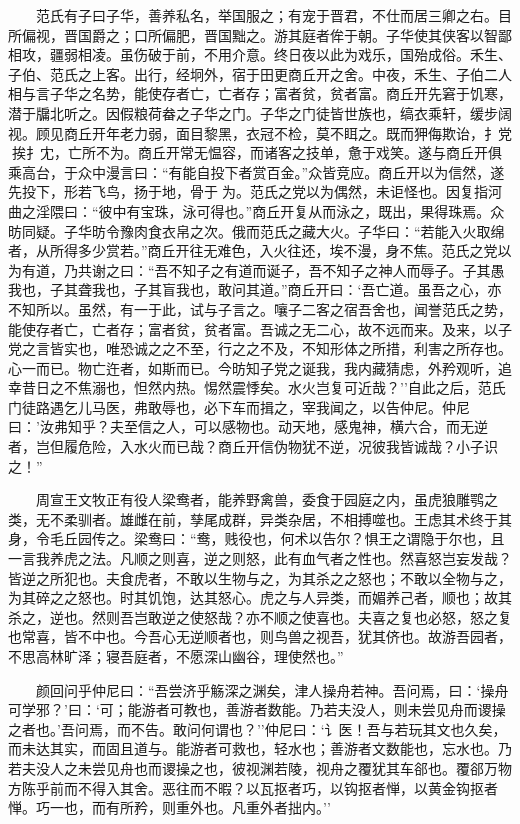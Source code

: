　　范氏有子曰子华，善养私名，举国服之；有宠于晋君，不仕而居三卿之右。目所偏视，晋国爵之；口所偏肥，晋国黜之。游其庭者侔于朝。子华使其侠客以智鄙相攻，疆弱相凌。虽伤破于前，不用介意。终日夜以此为戏乐，国殆成俗。禾生、子伯、范氏之上客。出行，经坰外，宿于田更商丘开之舍。中夜，禾生、子伯二人相与言子华之名势，能使存者亡，亡者存；富者贫，贫者富。商丘开先窘于饥寒，潜于牖北听之。因假粮荷畚之子华之门。子华之门徒皆世族也，缟衣乘轩，缓步阔视。顾见商丘开年老力弱，面目黎黑，衣冠不检，莫不眲之。既而狎侮欺诒，扌党挨扌冘，亡所不为。商丘开常无愠容，而诸客之技单，惫于戏笑。遂与商丘开俱乘高台，于众中漫言曰：``有能自投下者赏百金。''众皆竞应。商丘开以为信然，遂先投下，形若飞鸟，扬于地，骨于为。范氏之党以为偶然，未讵怪也。因复指河曲之淫隈曰：``彼中有宝珠，泳可得也。''商丘开复从而泳之，既出，果得珠焉。众昉同疑。子华昉令豫肉食衣帛之次。俄而范氏之藏大火。子华曰：``若能入火取绵者，从所得多少赏若。''商丘开往无难色，入火往还，埃不漫，身不焦。范氏之党以为有道，乃共谢之曰：``吾不知子之有道而诞子，吾不知子之神人而辱子。子其愚我也，子其聋我也，子其盲我也，敢问其道。''商丘开曰：`吾亡道。虽吾之心，亦不知所以。虽然，有一于此，试与子言之。嚷子二客之宿吾舍也，闻誉范氏之势，能使存者亡，亡者存；富者贫，贫者富。吾诚之无二心，故不远而来。及来，以子党之言皆实也，唯恐诚之之不至，行之之不及，不知形体之所措，利害之所存也。心一而已。物亡迕者，如斯而已。今昉知子党之诞我，我内藏猜虑，外矜观听，追幸昔日之不焦溺也，怛然内热。惕然震悸矣。水火岂复可近哉？''自此之后，范氏门徒路遇乞儿马医，弗敢辱也，必下车而揖之，宰我闻之，以告仲尼。仲尼曰：'汝弗知乎？夫至信之人，可以感物也。动天地，感鬼神，横六合，而无逆者，岂但履危险，入水火而已哉？商丘开信伪物犹不逆，况彼我皆诚哉？小子识之！''

　　周宣王文牧正有役人梁鸯者，能养野禽兽，委食于园庭之内，虽虎狼雕鹗之类，无不柔驯者。雄雌在前，孳尾成群，异类杂居，不相搏噬也。王虑其术终于其身，令毛丘园传之。梁鸯曰：``鸯，贱役也，何术以告尔？惧王之谓隐于尔也，且一言我养虎之法。凡顺之则喜，逆之则怒，此有血气者之性也。然喜怒岂妄发哉？皆逆之所犯也。夫食虎者，不敢以生物与之，为其杀之之怒也；不敢以全物与之，为其碎之之怒也。时其饥饱，达其怒心。虎之与人异类，而媚养己者，顺也；故其杀之，逆也。然则吾岂敢逆之使怒哉？亦不顺之使喜也。夫喜之复也必怒，怒之复也常喜，皆不中也。今吾心无逆顺者也，则鸟兽之视吾，犹其侪也。故游吾园者，不思高林旷泽；寝吾庭者，不愿深山幽谷，理使然也。''

　　颜回问乎仲尼曰：``吾尝济乎觞深之渊矣，津人操舟若神。吾问焉，曰：`操舟可学邪？'曰：`可；能游者可教也，善游者数能。乃若夫没人，则未尝见舟而谡操之者也。'吾问焉，而不告。敢问何谓也？''仲尼曰：`讠医！吾与若玩其文也久矣，而未达其实，而固且道与。能游者可救也，轻水也；善游者文数能也，忘水也。乃若夫没人之未尝见舟也而谡操之也，彼视渊若陵，视舟之覆犹其车郤也。覆郤万物方陈乎前而不得入其舍。恶往而不暇？以瓦抠者巧，以钩抠者惮，以黄金钩抠者惮。巧一也，而有所矜，则重外也。凡重外者拙内。''

